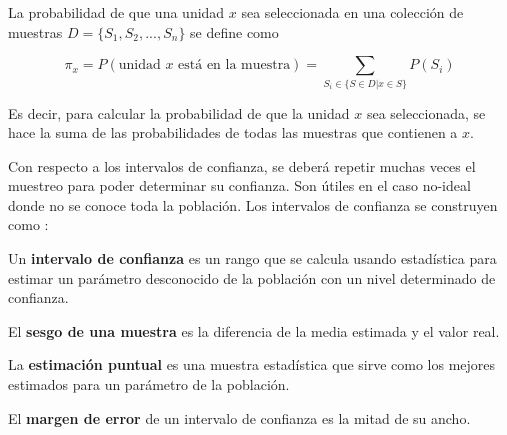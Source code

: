 \begin{definition}
    La probabilidad de que una unidad $x$ sea seleccionada en una colección de muestras $D = \{ S_1, S_2, ..., S_n \}$ se define como

    $$
    \pi_x = P(\text{unidad $x$ está en la muestra}) = \sum \limits_{S_i \in \{ S \in D | x \in S \}} P(S_i)
    $$
\end{definition}

\bigbreak

Es decir, para calcular la probabilidad de que la unidad $x$ sea seleccionada, se hace la suma de las probabilidades de todas las muestras que contienen a $x$.

\bigbreak

Con respecto a los intervalos de confianza, se deberá repetir muchas veces el muestreo para poder determinar su confianza. Son útiles en el caso no-ideal donde no se conoce toda la población. Los intervalos de confianza se construyen como \cite{the-pennsylvania-state-university-no-date}:

\begin{definition}
    Un \textbf{intervalo de confianza} es un rango que se calcula usando estadística para estimar un parámetro desconocido de la población con un nivel determinado de confianza.
\end{definition}

\bigbreak

\begin{definition}
    El \textbf{sesgo de una muestra} es la diferencia de la media estimada y el valor real.
\end{definition}

\bigbreak

\begin{definition}
    La \textbf{estimación puntual} es una muestra estadística que sirve como los mejores estimados para un parámetro de la población.
\end{definition}

\bigbreak

\begin{definition}
    El \textbf{margen de error} de un intervalo de confianza es la mitad de su ancho.
\end{definition}

\bigbreak

